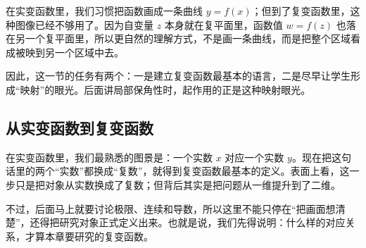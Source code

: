 \begin{wulibj}[为什么这一节不只是写个定义]
在实变函数里，我们习惯把函数画成一条曲线 $y=f(x)$；但到了复变函数里，这种图像已经不够用了。因为自变量 $z$ 本身就在复平面里，函数值 $w=f(z)$ 也落在另一个复平面里，所以更自然的理解方式，不是画一条曲线，而是把整个区域看成被映到另一个区域中去。

因此，这一节的任务有两个：一是建立复变函数最基本的语言，二是尽早让学生形成``映射''的眼光。后面讲局部保角性时，起作用的正是这种映射眼光。
\end{wulibj}

\subsection{从实变函数到复变函数}

在实变函数里，我们最熟悉的图景是：一个实数 $x$ 对应一个实数 $y$。现在把这句话里的两个``实数''都换成``复数''，就得到复变函数最基本的定义。表面上看，这一步只是把对象从实数换成了复数；但背后其实是把问题从一维提升到了二维。

不过，后面马上就要讨论极限、连续和导数，所以这里不能只停在``把画面想清楚''，还得把研究对象正式定义出来。也就是说，我们先得说明：什么样的对应关系，才算本章要研究的复变函数。

